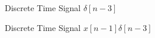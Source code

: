 \documentclass[fleqn]{article}
\begin{document}
\begin{enumerate}[nolistsep]
\begin{enumerate}[nolistsep]
			\begin{figure}[H]
			\centerline{}
		\caption{Discrete Time Signal $\delta[n-3]$}
		\label{part_e_delta_nm3}
		\end{figure}
		
		\begin{figure}[H]
			\centerline{}
		\caption{Discrete Time Signal $x[n-1]\delta[n-3]$}
		\label{part_e}
		\end{figure}
		
		\end{enumerate}
		
		
	\end{enumerate}
\end{document}
